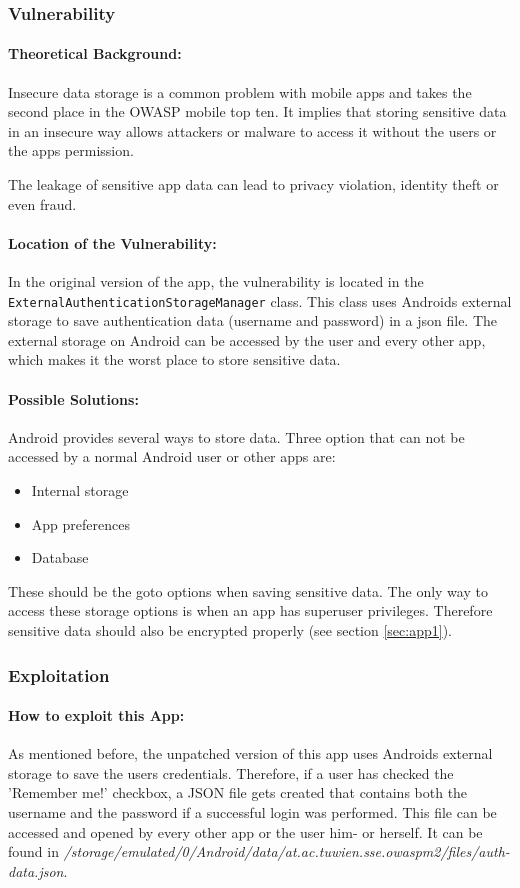 \subsubsection{Vulnerability}
\paragraph{Theoretical Background:}
Insecure data storage is a common problem with mobile apps and takes the second place in the OWASP mobile top ten. It implies that storing sensitive data in an insecure way allows attackers or malware to access it without the users or the apps permission.

The leakage of sensitive app data can lead to privacy violation, identity theft or even fraud.

\paragraph{Location of the Vulnerability:} In the original version of the app, the vulnerability is located in the \texttt{ExternalAuthenticationStorageManager} class. This class uses Androids external storage to save authentication data (username and password) in a json file. The external storage on Android can be accessed by the user and every other app, which makes it the worst place to store sensitive data.

\paragraph{Possible Solutions:} Android provides several ways to store data. Three option that can not be accessed by a normal Android user or other apps are:
\begin{itemize}
	\item Internal storage
	\item App preferences
	\item Database
\end{itemize}
These should be the goto options when saving sensitive data. The only way to access these storage options is when an app has superuser privileges. Therefore sensitive data should also be encrypted properly (see section \ref{sec:app1}).


\subsubsection{Exploitation}
\paragraph{How to exploit this App:}
As mentioned before, the unpatched version of this app uses Androids external storage to save the users credentials. Therefore, if a user has checked the 'Remember me!' checkbox, a JSON file gets created that contains both the username and the password if a successful login was performed. This file can be accessed and opened by every other app or the user him- or herself. It can be found in \textit{/storage/emulated/0/Android/data/at.ac.tuwien.sse.owaspm2/files/auth-data.json}.

